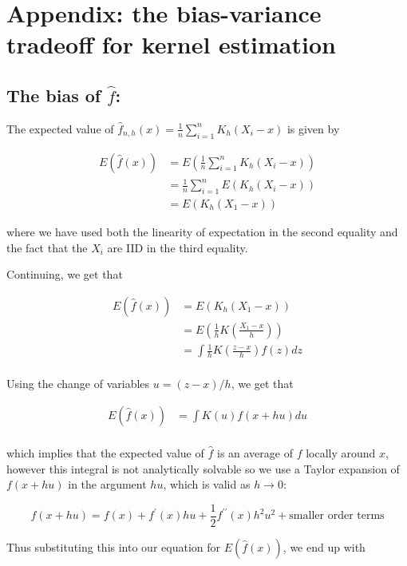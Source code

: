 \section{Appendix: the bias-variance tradeoff for kernel estimation}


\subsection*{The bias of $\hat{f}$:}

The expected value of $\hat{f}_{n, h}(x) = \frac{1}{n} \sum_{i=1}^n K_h(X_i - x)$ is given by


\begin{align*}
E(\hat{f}(x)) &= E\left( \frac{1}{n} \sum_{i=1}^n K_h(X_i - x) \right)\\ 
              &= \frac{1}{n} \sum_{i=1}^n E(K_h(X_i - x)) \\
              &= E(K_h(X_1 - x))
\end{align*}

where we have used both the linearity of expectation in the second equality and the fact that the $X_i$ are IID in the third equality.

Continuing, we get that


\begin{align*}
E(\hat{f}(x))  & = E(K_h(X_1 - x))  \\
                     & = E\left( \frac{1}{h} K\left(\frac{X_1 - x}{h}\right) \right) \\
                     & = \int \frac{1}{h} K\left( \frac{z - x}{h} \right) f(z) dz \\
\end{align*}


Using the change of variables $u = (z - x)/h$, we get that



\begin{align*}
E(\hat{f}(x)) & = \int K\left( u \right) f(x + hu) du \\ 
\end{align*}

which implies that the expected value of $\hat{f}$ is an average of $f$ locally around $x$, however this integral is not analytically solvable so we use a Taylor expansion of $f(x + hu)$ in the argument $hu$, which is valid as $h \rightarrow 0$:

$$f(x + hu) = f(x) + f^{\prime}(x) hu + \frac12 f^{\prime\prime}(x) h^2 u^2 + \text{smaller order terms} $$

Thus substituting this into our equation for $E(\hat{f}(x))$, we end up with


